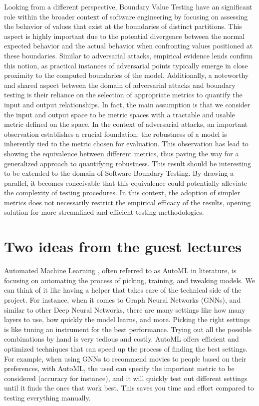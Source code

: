 \documentclass[a4paper,11pt]{article}
\begin{document}
\noindent Looking from a different perspective, Boundary Value Testing have an significant role within the broader context of software engineering by focusing on assessing the behavior of values that exist at the boundaries of distinct partitions. This aspect is highly important due to the potential divergence between the normal expected behavior and the actual behavior when confronting values positioned at these boundaries. Similar to adversarial attacks, empirical evidence lends confirm this notion, as practical instances of adversarial points typically emerge in close proximity to the computed boundaries of the model.
Additionally, a noteworthy and shared aspect between the domain of adversarial attacks and boundary testing is their reliance on the selection of appropriate metrics to quantify the input and output relationships. In fact, the main assumption is that we consider the input and output space to be metric spaces with a tractable and usable metric defined on the space.
In the context of adversarial attacks, an important observation establishes a crucial foundation: the robustness of a model is inherently tied to the metric chosen for evaluation. This observation has lead to showing the equivalence between different metrics, thus paving the way for a generalized approach to quantifying robustness. This result should be interesting to be extended to the domain of Software Boundary Testing. By drawing a parallel, it becomes conceivable that this equivalence could potentially alleviate the complexity of testing procedures. In this context, the adoption of simpler metrics does not necessarily restrict the empirical efficacy of the results, opening solution for more streamlined and efficient testing methodologies.


\section{Two ideas from the guest lectures}

Automated Machine Learning , often referred to as AutoML in literature, is focusing on automating the process of picking, training, and tweaking models. We can think of it like having a helper that takes care of the technical side of the project. For instance, when it comes to Graph Neural Networks (GNNs), and similar to other Deep Neural Networks, there are many settings like how many layers to use, how quickly the model learns, and more. Picking the right settings is like tuning an instrument for the best performance. Trying out all the possible combinations by hand is very tedious and costly. AutoML offers efficient and optimized techniques that can speed up the process of finding the best settings. 
For example, when using GNNs to recommend movies to people based on their preferences, with AutoML, the used can specify the important metric to be considered (accuracy for instance), and it will quickly test out different settings until it finds the ones that work best. This saves you time and effort compared to testing everything manually. \\
\end{document}
